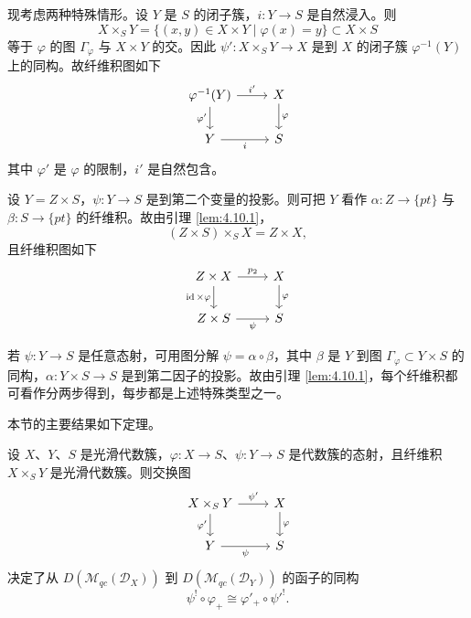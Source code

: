 现考虑两种特殊情形。设 $Y$ 是 $S$ 的闭子簇，$i:Y\to S$ 是自然浸入。则
$$X\times_SY=\{(x,y)\in X\times Y\mid\varphi(x)=y\}\subset X\times S$$
等于 $\varphi$ 的图 $\Gamma_\varphi$ 与 $X\times Y$ 的交。因此 $\psi':X\times_SY\to X$ 是到 $X$ 的闭子簇 $\varphi^{-1}(Y)$ 上的同构。故纤维积图如下
$$\begin{tikzcd}
\varphi^{-1}(Y) \arrow[r,"i'"] \arrow[d,"\varphi'"' ] & X \arrow[d,"\varphi"]\\
Y \arrow[r,"i"'] & S
\end{tikzcd}$$
其中 $\varphi'$ 是 $\varphi$ 的限制，$i'$ 是自然包含。

设 $Y=Z\times S$，$\psi:Y\to S$ 是到第二个变量的投影。则可把 $Y$ 看作 $\alpha:Z\to\{pt\}$ 与 $\beta:S\to\{pt\}$ 的纤维积。故由引理 \ref{lem:4.10.1}，
$$(Z\times S)\times_SX=Z\times X,$$
且纤维积图如下
$$\begin{tikzcd}
Z\times X \arrow[r,"p_2"] \arrow[d,"\operatorname{id}\times\varphi"'] & X \arrow[d,"\varphi"]\\
Z\times S \arrow[r,"\psi"'] & S
\end{tikzcd}$$

若 $\psi:Y\to S$ 是任意态射，可用图分解 $\psi=\alpha\circ\beta$，其中 $\beta$ 是 $Y$ 到图 $\Gamma_\varphi\subset Y\times S$ 的同构，$\alpha:Y\times S\to S$ 是到第二因子的投影。故由引理 \ref{lem:4.10.1}，每个纤维积都可看作分两步得到，每步都是上述特殊类型之一。

本节的主要结果如下定理。

\begin{theorem}\label{thm:4.10.2}
设 $X$、$Y$、$S$ 是光滑代数簇，$\varphi:X\to S$、$\psi:Y\to S$ 是代数簇的态射，且纤维积 $X\times_SY$ 是光滑代数簇。则交换图
$$\begin{tikzcd}
X\times_SY \arrow[r,"\psi'"] \arrow[d,"\varphi'"' ] & X \arrow[d,"\varphi"]\\
Y \arrow[r,"\psi"'] & S
\end{tikzcd}$$
决定了从 $D(\mathcal{M}_{qc}(\mathcal{D}_X))$ 到 $D(\mathcal{M}_{qc}(\mathcal{D}_Y))$ 的函子的同构
$$\psi^!\circ\varphi_+\cong\varphi'_+\circ\psi'^!.$$
\end{theorem}


